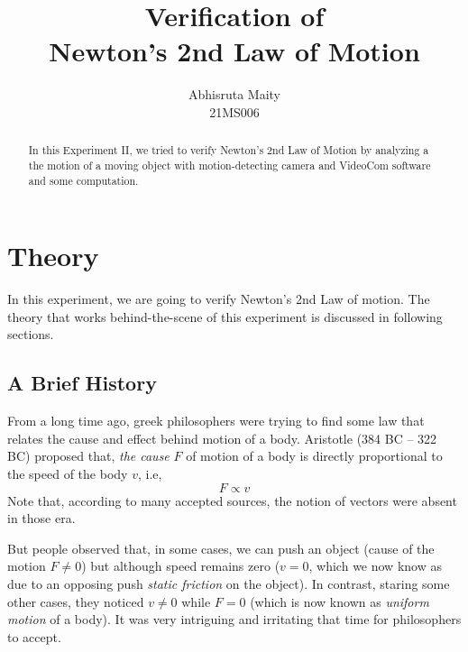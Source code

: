 \documentclass[11pt, a4paper, abstract=true]{scrartcl}
\begin{document}
\subject{
    PH1102: Experiment II
}
\title{
    \Huge Verification of \\
    Newton's 2nd Law of Motion
}
\author{
    Abhisruta Maity \\
    {\normalsize 21MS006}
}
\date{}
\publishers{
    \normalsize \emph{Indian Institute of Science Education and Research, Kolkata \\
    Mohanpur, West Bengal, 741246, India}
}
\maketitle
\begin{abstract}
    \sffamily
    In this Experiment II, we tried to verify Newton's 2nd Law of Motion by analyzing a the motion of a moving object with motion-detecting camera and VideoCom software and some computation.
\end{abstract}

\vspace{-2em}

\tableofcontents

\newpage
\section{Theory}
In this experiment, we are going to verify Newton's 2nd Law of motion. The theory that works behind-the-scene of this experiment is discussed in following sections.
\subsection{A Brief History}
From a long time ago, greek philosophers were trying to find some law that relates the cause and effect behind motion of a body. Aristotle (384 BC – 322 BC) proposed that, \emph{the cause} \(F\) of motion of a body is directly proportional to the speed of the body \(v\), i.e, \[F \propto v\] Note that, according to many accepted sources, the notion of vectors were absent in those era.

But people observed that, in some cases, we can push an object (cause of the motion \(F \neq 0\)) but although speed remains zero (\(v = 0\), which we now know as due to an opposing push \emph{static friction} on the object). In contrast, staring some other cases, they noticed \(v \neq 0\) while \(F = 0\) (which is now known as \emph{uniform motion} of a body). It was very intriguing and irritating that time for philosophers to accept.
\end{document}
